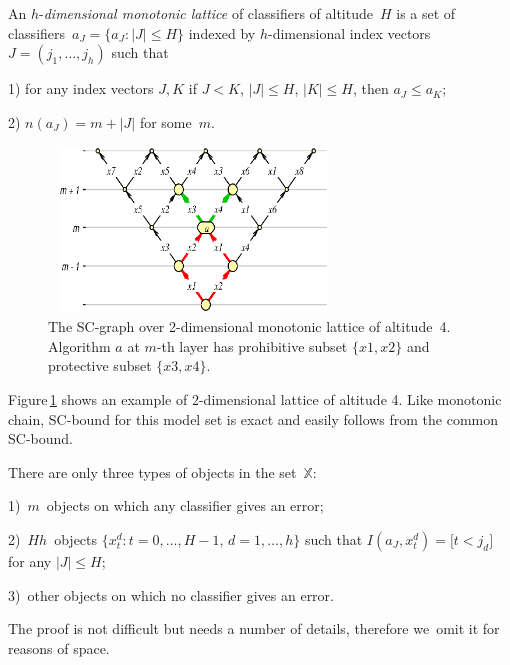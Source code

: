 \documentclass{article}
\def\XX{\mathbb{X}}
\renewcommand{\leq}{\leqslant}
\renewcommand{\emph}[1]{\textit{#1}}
\begin{document}
\begin{definition}
    An $h$-\emph{dimensional monotonic lattice} of classifiers of altitude~$H$
    is a set of classifiers~$a_J = \bigl\{a_J \colon |J|\leq H \bigr\}$
    indexed by $h$-dimensional index vectors $J=(j_1,\ldots,j_h)$  such that

    1) for any index vectors $J,K$ if $J<K$,\; $|J| \leq H$,\; $|K| \leq H$, then $a_J \leq a_K$;

    2) $n(a_J) = m + |J|$ for some~$m$.
\end{definition}
\begin{figure}[t!]
    \noindent\centering
    \includegraphics[width=77mm,height=44mm]{SC-graph-3a.eps}
    \caption{The SC-graph over 2-dimensional monotonic lattice of altitude~4.
        Algorithm $a$ at $m$-th layer has
        prohibitive subset $\{x1, x2\}$ and protective subset $\{x3, x4\}$.}
    \label{fig:SC-graph-3a}
\end{figure}

Figure\,\ref{fig:SC-graph-3a} shows an example of 2-dimensional lattice of altitude 4.
Like monotonic chain,
\mbox{SC-bound} for this model set is exact and easily follows from the common SC-bound.

\begin{lemma}
\label{lem:lattice-objects}
    There are only three types of objects in the set~$\XX$:

    1)~$m$~objects on which any classifier gives an error;\;

    2)~$Hh$~objects
    $\bigl\{x_t^d\colon t=0,\ldots,H{-}1,\, d=1,\ldots,h \bigr\}$
    such that
    $I(a_J,x_t^d) = \bigl[ t<j_d \bigr]$
    for any $|J| \leq H$;

    3)~other objects on which no classifier gives an error.
\end{lemma}
The proof is not difficult but needs a number of details, therefore we~omit it for reasons of space.
\end{document}
